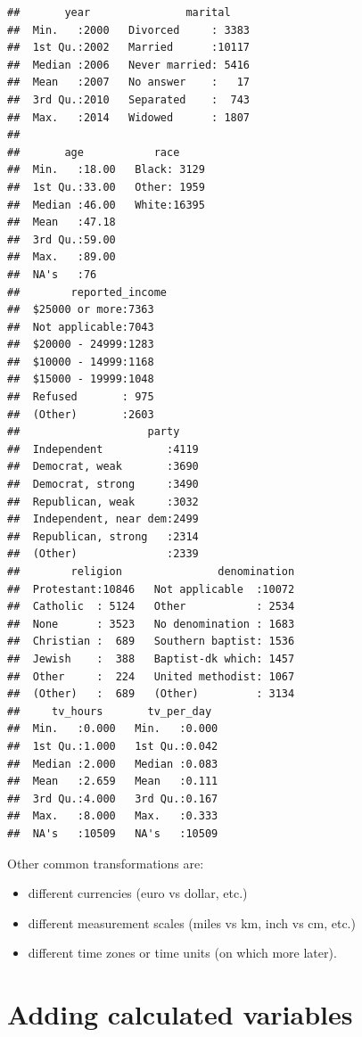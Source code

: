 \documentclass[]{tufte-book}
\providecommand{\tightlist}{%
  \setlength{\itemsep}{0pt}\setlength{\parskip}{0pt}}
\begin{document}
\begin{verbatim}
##       year               marital     
##  Min.   :2000   Divorced     : 3383  
##  1st Qu.:2002   Married      :10117  
##  Median :2006   Never married: 5416  
##  Mean   :2007   No answer    :   17  
##  3rd Qu.:2010   Separated    :  743  
##  Max.   :2014   Widowed      : 1807  
##                                      
##       age           race      
##  Min.   :18.00   Black: 3129  
##  1st Qu.:33.00   Other: 1959  
##  Median :46.00   White:16395  
##  Mean   :47.18                
##  3rd Qu.:59.00                
##  Max.   :89.00                
##  NA's   :76                   
##        reported_income
##  $25000 or more:7363  
##  Not applicable:7043  
##  $20000 - 24999:1283  
##  $10000 - 14999:1168  
##  $15000 - 19999:1048  
##  Refused       : 975  
##  (Other)       :2603  
##                    party     
##  Independent          :4119  
##  Democrat, weak       :3690  
##  Democrat, strong     :3490  
##  Republican, weak     :3032  
##  Independent, near dem:2499  
##  Republican, strong   :2314  
##  (Other)              :2339  
##        religion               denomination  
##  Protestant:10846   Not applicable  :10072  
##  Catholic  : 5124   Other           : 2534  
##  None      : 3523   No denomination : 1683  
##  Christian :  689   Southern baptist: 1536  
##  Jewish    :  388   Baptist-dk which: 1457  
##  Other     :  224   United methodist: 1067  
##  (Other)   :  689   (Other)         : 3134  
##     tv_hours       tv_per_day   
##  Min.   :0.000   Min.   :0.000  
##  1st Qu.:1.000   1st Qu.:0.042  
##  Median :2.000   Median :0.083  
##  Mean   :2.659   Mean   :0.111  
##  3rd Qu.:4.000   3rd Qu.:0.167  
##  Max.   :8.000   Max.   :0.333  
##  NA's   :10509   NA's   :10509
\end{verbatim}

Other common transformations are:

\begin{itemize}
\tightlist
\item
  different currencies (euro vs dollar, etc.)
\item
  different measurement scales (miles vs km, inch vs cm, etc.)
\item
  different time zones or time units (on which more later).
\end{itemize}

\section{Adding calculated variables}\label{adding-calculated-variables}
\end{document}
